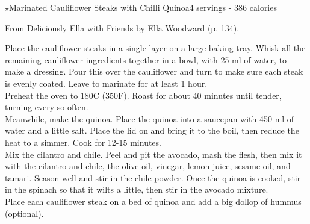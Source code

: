\begin{recipe}{\texorpdfstring{$\star$}{str}Marinated Cauliflower Steaks with Chilli Quinoa}{4 servings - 386 calories}{}

\freeform From {\normalfont Deliciously Ella with Friends} by Ella Woodward (p. 134).


Place the cauliflower steaks in a single layer on a large baking tray. Whisk all the remaining cauliflower ingredients together in a bowl, with 25 ml of water, to make a dressing. Pour this over the cauliflower and turn to make sure each steak is evenly coated. Leave to marinate for at least 1 hour.\\

Preheat the oven to 180\textdegree C (350\textdegree F). Roast for about 40 minutes until tender, turning every so often.\\

Meanwhile, make the quinoa. Place the quinoa into a saucepan with 450 ml of water and a little salt. Place the lid on and bring it to the boil, then reduce the heat to a simmer. Cook for 12-15 minutes.\\

Mix the cilantro and chile. Peel and pit the avocado, mash the flesh, then mix it with the cilantro and chile, the olive oil, vinegar, lemon juice, sesame oil, and tamari. Season well and stir in the chile powder. Once the quinoa is cooked, stir in the spinach so that it wilts a little, then stir in the avocado mixture.\\

Place each cauliflower steak on a bed of quinoa and add a big dollop of hummus (optional).

\end{recipe}